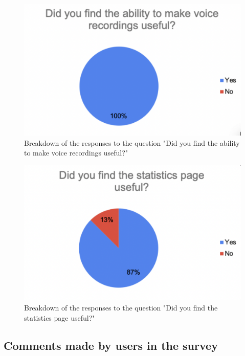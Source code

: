 \documentclass{l4proj}
\begin{document}
\begin{appendices}
\begin{figure}[H]
    \begin{centering}
    \includegraphics[scale=0.5]{images/userSurvey3.pdf}
    \caption{Breakdown of the responses to the question "Did you find the ability to make voice recordings useful?"}
    \label{fig: userSurvey3}
    \end{centering}
\end{figure}

\begin{figure}[H]
    \begin{centering}
    \includegraphics[scale=0.5]{images/userSurvey4.pdf}
    \caption{Breakdown of the responses to the question "Did you find the statistics page useful?"}
    \label{fig: userSurvey4}
    \end{centering}
\end{figure}

\subsection{Comments made by users in the survey}







\end{appendices}
\end{document}
